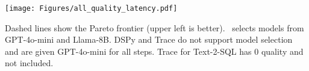 {
\begin{figure*}[t!]
\hfill
\begin{minipage}{\textwidth}
\begin{center}
\centerline{\texttt{[image: Figures/all\_quality\_latency.pdf]}}
\end{center}
\end{minipage}
\hfill
\vspace{-0.3in}
{
Dashed lines show the Pareto frontier (upper left is better). \sysname\ selects models from GPT-4o-mini and Llama-8B. DSPy and Trace do not support model selection and are given GPT-4o-mini for all steps.
Trace for Text-2-SQL has 0 quality and not included.
}
\vspace{0.1in}
\end{figure*}
}